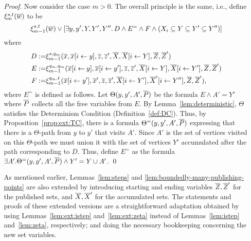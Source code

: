 \begin{proof}
Now consider the case $m > 0$.  The overall principle is the same, i.e., define $\xi_m^{s,t}(\overline{w})$ to be
\[
\xi_{m-1}^{s,t}(\overline{w}) \vee
\left[\exists y,y', Y, Y',Y''. \, D \wedge E^{=} \wedge F \wedge (X_i \subseteq Y \subseteq Y' \subseteq Y'')\right]
\]
where
%
\begin{eqnarray*}
D := & \xi_{m-1}^{s,q_m}(\overline{x},\overline{x}[i \leftarrow y],\overline{z},\overline{z}',\overline{X},\overline{X}[i \leftarrow Y],\overline{Z},\overline{Z}')\\
E := & \xi_{m-1}^{q_m,q_m}(\overline{x}[i \leftarrow y],\overline{x}[i \leftarrow y'],\overline{z},\overline{z}',\overline{X}[i \leftarrow Y],\overline{X}[i \leftarrow Y'],\overline{Z},\overline{Z}')\\
F := & \xi_{m-1}^{q_m,t}(\overline{x}[i \leftarrow y'],\overline{x}',\overline{z},\overline{z}',\overline{X}[i \leftarrow Y'],\overline{X}'[i \leftarrow Y''],\overline{Z},\overline{Z}'),
\end{eqnarray*}
where $E^=$ is defined as follows. Let $\Theta(y,y',A',\overline{P})$ be the \msol formula $E \wedge A' = Y'$ where
$\overline{P}$ collects all the free variables from $E$.
By Lemma~\ref{lem:deterministic}, $\Theta$ satisfies the Determinism Condition (Definition~\ref{def:DC}). Thus,
by Proposition~\ref{prop:ext:TC}, there is a formula $\Theta^=(y,y',A',\overline{P})$ expressing that there is a $\Theta$-path from $y$ to $y'$ that visits $A'$. Since
$A'$ is the set of vertices visited on this $\Theta$-path we must union it with the set of vertices $Y'$ accumulated after the path corresponding to $D$.
Thus, define $E^=$ as the formula $\exists A'. \Theta^=(y,y',A',\overline{P}) \wedge Y' = Y \cup A'$.
\qed
\end{proof}

As mentioned earlier, Lemmas~\ref{lem:steps} and \ref{lem:boundedly-many-publishing-points} are also extended
by introducing starting and ending variables $\overline{Z},\overline{Z}'$ for the published sets,
and $\overline{X}, \overline{X}'$ for the accumulated sets. The statements and proofs of these extended versions are a straightforward adaptation obtained by using Lemmas~\ref{lem:ext:istep} and~\ref{lem:ext:zeta} instead of Lemmas~\ref{lem:istep} and~\ref{lem:zeta}, respectively; and doing the necessary bookkeeping concerning the new set variables.


